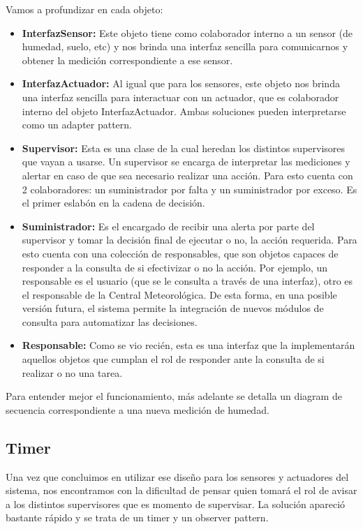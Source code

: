 \newpage Vamos a profundizar en cada objeto:

\begin{itemize}
\item \textbf{InterfazSensor:} Este objeto tiene como colaborador interno a un sensor (de humedad, suelo, etc) y nos brinda una interfaz sencilla para comunicarnos y obtener la medición correspondiente a ese sensor.

\item \textbf{InterfazActuador:} Al igual que para los sensores, este objeto nos brinda una interfaz sencilla para interactuar con un actuador, que es colaborador interno del objeto InterfazActuador. Ambas soluciones pueden interpretarse como un adapter pattern.

\item \textbf{Supervisor:} Esta es una clase de la cual heredan los distintos supervisores que vayan a usarse. Un supervisor se encarga de interpretar las mediciones y alertar en caso de que sea necesario realizar una acción. Para esto cuenta con 2 colaboradores: un suministrador por falta y un suministrador por exceso. Es el primer eslabón en la cadena de decisión.

\item \textbf{Suministrador:} Es el encargado de recibir una alerta por parte del supervisor y tomar la decisión final de ejecutar o no, la acción requerida. Para esto cuenta con una colección de responsables, que son objetos capaces de responder a la consulta de si efectivizar o no la acción. Por ejemplo, un responsable es el usuario (que se le consulta a través de una interfaz), otro es el responsable de la Central Meteorológica. De esta forma, en una posible versión futura, el sistema permite la integración de nuevos módulos de consulta para automatizar las decisiones.

\item \textbf{Responsable:} Como se vio recién, esta es una interfaz que la implementarán aquellos objetos que cumplan el rol de responder ante la consulta de si realizar o no una tarea. 
\end{itemize}
Para entender mejor el funcionamiento, más adelante se detalla un diagram de secuencia correspondiente a una nueva medición de humedad.


\subsection{Timer}
Una vez que concluimos en utilizar ese diseño para los sensores y actuadores del sistema, nos encontramos con la dificultad de pensar quien tomará el rol de avisar a los distintos supervisores que es momento de supervisar. La solución apareció bastante rápido y se trata de un timer y un observer pattern.

